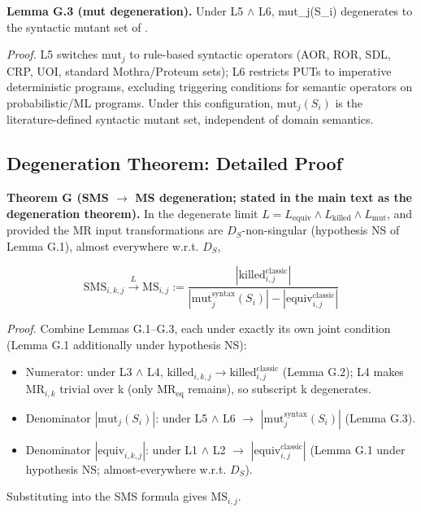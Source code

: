 \documentclass[manuscript,screen,review]{acmart}
\begin{document}
\textbf{Lemma G.3 (mut degeneration).} Under L5 $\wedge$ L6, mut\_j(S\_i)
degenerates to the syntactic mutant set of \citet{jia2011analysis}.

\emph{Proof.} L5 switches $\mathrm{mut}_j$ to rule-based syntactic operators (AOR,
ROR, SDL, CRP, UOI, standard Mothra/Proteum sets); L6 restricts PUTs
to imperative deterministic programs, excluding triggering conditions
for semantic operators on probabilistic/ML programs. Under this
configuration, $\mathrm{mut}_j(S_i)$ is the literature-defined syntactic mutant
set, independent of domain semantics.

\subsection{Degeneration Theorem: Detailed Proof}\label{g.4-theorem-9.1-detailed-proof}

\textbf{Theorem G (SMS $\to$ MS degeneration; stated in the main text
as the degeneration theorem).} In the degenerate limit
$L = L_{\mathrm{equiv}} \wedge L_{\mathrm{killed}} \wedge L_{\mathrm{mut}}$, and provided the MR
input transformations are $D_S$-non-singular (hypothesis NS of Lemma G.1),
almost everywhere w.r.t. $D_S$,

\[ \mathrm{SMS}_{i,k,j} \xrightarrow{L} \mathrm{MS}_{i,j} := \frac{|\mathrm{killed}_{i,j}^{\mathrm{classic}}|}{|\mathrm{mut}_j^{\mathrm{syntax}}(S_i)| - |\mathrm{equiv}_{i,j}^{\mathrm{classic}}|} \]

\emph{Proof.} Combine Lemmas G.1--G.3, each under exactly its own
joint condition (Lemma G.1 additionally under hypothesis NS):

\begin{itemize}

\item
  Numerator: under L3 $\wedge$ L4, $\mathrm{killed}_{i,k,j} \to
  \mathrm{killed}_{i,j}^{\mathrm{classic}}$ (Lemma G.2); L4 makes $\mathrm{MR}_{i,k}$ trivial
  over k (only $\mathrm{MR}_{\mathrm{eq}}$ remains), so subscript k degenerates.
\item
  Denominator $|\mathrm{mut}_j(S_i)|$: under L5 $\wedge$ L6 $\to$
  $|\mathrm{mut}_j^{\mathrm{syntax}}(S_i)|$ (Lemma G.3).
\item
  Denominator $|\mathrm{equiv}_{i,k,j}|$: under L1 $\wedge$ L2 $\to$
  $|\mathrm{equiv}_{i,j}^{\mathrm{classic}}|$ (Lemma G.1 under
  hypothesis NS; almost-everywhere w.r.t. $D_S$).
\end{itemize}

Substituting into the SMS formula gives $\mathrm{MS}_{i,j}$.
\end{document}
